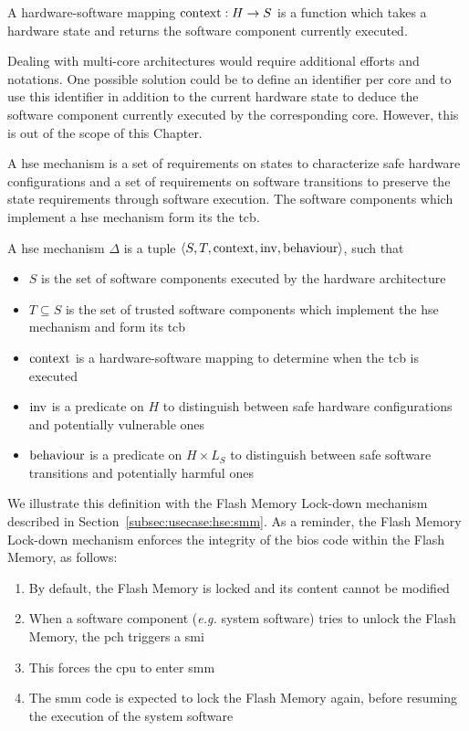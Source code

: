 \begin{definition}
  \label{def:hardsoftmap}
  A hardware-software mapping $\mathrm{con\-text} : H \rightarrow S$ is a function
  which takes a hardware state and returns the software component currently
  executed.
\end{definition}

Dealing with multi-core architectures would require additional efforts and
notations.
%
One possible solution could be to define an identifier per core and to use this
identifier in addition to the current hardware state to deduce the software
component currently executed by the corresponding core.
%
However, this is out of the scope of this Chapter.

A \ac{hse} mechanism is a set of requirements on states to characterize safe
hardware configurations and a set of requirements on software transitions to
preserve the state requirements through software execution.
%
The software components which implement a \ac{hse} mechanism form its the
\ac{tcb}.

\begin{definition}
  \label{def:speccert:hse}
  A \ac{hse} mechanism $\Delta$ is a tuple
  $\langle S, T, \mathrm{context}, \mathrm{inv}, \mathrm{behaviour} \rangle$, such
  that
  \begin{itemize}
  \item $S$ is the set of software components executed by the hardware
    architecture
  \item $T \subseteq S$ is the set of trusted software components which
    implement the \ac{hse} mechanism and form its \ac{tcb}
  \item $\mathrm{context}$ is a hardware-software mapping to determine when the
    \ac{tcb} is executed
  \item $\mathrm{inv}$ is a predicate on $H$ to distinguish between safe hardware
    configurations and potentially vulnerable ones
  \item $\mathrm{behaviour}$ is a predicate on $H \times L_S$ to distinguish
    between safe software transitions and potentially harmful ones
  \end{itemize}
\end{definition}

We illustrate this definition with the Flash Memory Lock-down mechanism
described in Section~\ref{subsec:usecase:hse:smm}.
%
As a reminder, the Flash Memory Lock-down mechanism enforces the integrity of
the \ac{bios} code within the Flash Memory, as follows:
%
\begin{enumerate}
\item By default, the Flash Memory is locked and its content cannot be modified
%
\item When a software component (\emph{e.g.} system software) tries to unlock
  the Flash Memory, the \ac{pch} triggers a \ac{smi}
%
\item This forces the \ac{cpu} to enter \ac{smm}
%
\item The \ac{smm} code is expected to lock the Flash Memory again, before
  resuming the execution of the system software
\end{enumerate}

